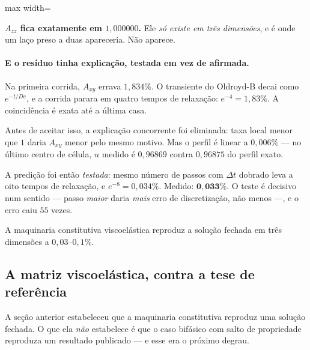 \begin{adjustbox}{max width=\linewidth}
\end{adjustbox}

\textbf{$A_{zz}$ fica exatamente em $1{,}000000$.} Ele \emph{s\'o existe em tr\^es
dimens\~oes}, e \'e onde um la\c{c}o preso a duas apareceria. N\~ao aparece.

\paragraph{E o res\'iduo tinha explica\c{c}\~ao, testada em vez de afirmada.} Na
primeira corrida, $A_{xy}$ errava $1{,}834\%$. O transiente do Oldroyd-B decai
como $e^{-t/De}$, e a corrida parara em quatro tempos de relaxa\c{c}\~ao:
$e^{-4} = 1{,}83\%$. A coincid\^encia \'e exata at\'e a \'ultima casa.

Antes de aceitar isso, a explica\c{c}\~ao concorrente foi eliminada: taxa local
menor que $1$ daria $A_{xy}$ menor pelo mesmo motivo. Mas o perfil \'e linear a
$0{,}006\%$ --- no \'ultimo centro de c\'elula, $u$ medido \'e $0{,}96869$ contra
$0{,}96875$ do perfil exato.

A predi\c{c}\~ao foi ent\~ao \emph{testada}: mesmo n\'umero de passos com
$\Delta t$ dobrado leva a oito tempos de relaxa\c{c}\~ao, e $e^{-8}=0{,}034\%$.
Medido: $\mathbf{0{,}033\%}$. O teste \'e decisivo num sentido --- passo
\emph{maior} daria \emph{mais} erro de discretiza\c{c}\~ao, n\~ao menos ---, e o
erro caiu $55$ vezes.

A maquinaria constitutiva viscoel\'astica reproduz a solu\c{c}\~ao fechada em
tr\^es dimens\~oes a $0{,}03$--$0{,}1\%$.

\subsection{A matriz viscoel\'astica, contra a tese de refer\^encia}
\label{sec:tridim-ve-matriz}

A se\c{c}\~ao anterior estabeleceu que a maquinaria constitutiva reproduz uma
solu\c{c}\~ao fechada. O que ela \emph{n\~ao} estabelece \'e que o caso bif\'asico
com salto de propriedade reproduza um resultado publicado --- e esse era o
pr\'oximo degrau.


